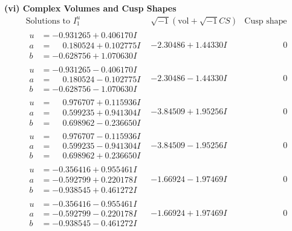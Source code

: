\documentclass[1p]{elsarticle_modified}
\theoremstyle{definition}
\newcommand{\I}{\sqrt{-1}}
\begin{document}
\newpage\flushleft \textbf{(vi) Complex Volumes and Cusp Shapes}
$$\begin{array}{c|c|c}  
\text{Solutions to }I^u_{1}& \I (\text{vol} + \sqrt{-1}CS) & \text{Cusp shape}\\
 \hline 
\begin{aligned}
u &= -0.931265 + 0.406170 I \\
a &= \phantom{-}0.180524 + 0.102775 I \\
b &= -0.628756 + 1.070630 I\end{aligned}
 & -2.30486 + 1.44330 I & \phantom{-0.000000 } 0 \\ \hline\begin{aligned}
u &= -0.931265 - 0.406170 I \\
a &= \phantom{-}0.180524 - 0.102775 I \\
b &= -0.628756 - 1.070630 I\end{aligned}
 & -2.30486 - 1.44330 I & \phantom{-0.000000 } 0 \\ \hline\begin{aligned}
u &= \phantom{-}0.976707 + 0.115936 I \\
a &= \phantom{-}0.599235 + 0.941304 I \\
b &= \phantom{-}0.698962 - 0.236650 I\end{aligned}
 & -3.84509 + 1.95256 I & \phantom{-0.000000 } 0 \\ \hline\begin{aligned}
u &= \phantom{-}0.976707 - 0.115936 I \\
a &= \phantom{-}0.599235 - 0.941304 I \\
b &= \phantom{-}0.698962 + 0.236650 I\end{aligned}
 & -3.84509 - 1.95256 I & \phantom{-0.000000 } 0 \\ \hline\begin{aligned}
u &= -0.356416 + 0.955461 I \\
a &= -0.592799 + 0.220178 I \\
b &= -0.938545 + 0.461272 I\end{aligned}
 & -1.66924 - 1.97469 I & \phantom{-0.000000 } 0 \\ \hline\begin{aligned}
u &= -0.356416 - 0.955461 I \\
a &= -0.592799 - 0.220178 I \\
b &= -0.938545 - 0.461272 I\end{aligned}
 & -1.66924 + 1.97469 I & \phantom{-0.000000 } 0 \\ \hline\begin{aligned}

\end{aligned}
\end{array}$$
\end{document}
